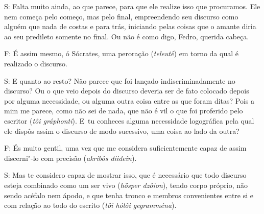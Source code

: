 S: Falta muito ainda, ao que parece, para que ele realize isso que
procuramos. Ele nem começa pelo começo, mas pelo final, empreendendo seu
discurso como alguém que nada de costas e para trás, iniciando pelas
coisas que o amante diria ao seu predileto somente no final. Ou não é
como digo, Fedro, querida cabeça.

 

\bekker{[264b]} F: É assim mesmo, ó Sócrates, uma peroração (\emph{teleutḗ})
em torno da qual é realizado o discurso.

 

S: E quanto ao resto? Não parece que foi lançado indiscriminadamente no
discurso? Ou o que veio depois do discurso deveria ser de fato colocado
depois por alguma necessidade, ou alguma outra coisa entre as que foram
ditas? Pois a mim me parece, como não sei de nada, que não é vil o que
foi proferido pelo escritor (\emph{tôi gráphonti}). E~tu conheces alguma
necessidade logográfica pela qual ele dispôs assim o discurso de modo
sucessivo, uma coisa ao lado da outra?

 

F: És muito gentil, uma vez que me considera suficientemente capaz de
assim discerni"-lo com precisão (\emph{akribôs diideîn}).

 

\bekker{[264c]} S: Mas te considero capaz de mostrar isso, que é necessário
que todo discurso esteja combinado como um ser vivo (\emph{hṓsper
dzôion}), tendo corpo próprio, não sendo acéfalo nem ápodo, e que tenha
tronco e membros convenientes entre si e com relação ao todo do escrito
(\emph{tôi hólôi gegramména}).

